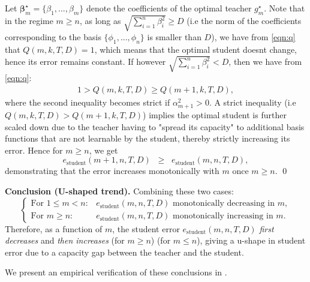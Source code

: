 Let $\bm{\beta}^\star_m = \{\beta_1,...,\beta_m\}$ denote the coefficients of the optimal teacher $g^\star_m$. Note that in the regime $m\geq n$, as long as $\sqrt{\sum_{i=1}^n\beta_i^2}\geq D$ (i.e the norm of the coefficients corresponding to the basis $\{\phi_1,...,\phi_n\}$ is smaller than $D$), we have from \cref{eqn:q} that $Q(m,k,T,D) = 1$, which means that the optimal student doesnt change, hence its error remains constant. If however $\sqrt{\sum_{i=1}^n\beta_i^2}<D$, then we have from \cref{eqn:q}:
\begin{align}
	1 > Q(m,k,T,D) \geq Q(m+1,k,T,D),
\end{align}
where the second inequality becomes strict if $\alpha_{m+1}^2>0$. A strict inequality (i.e $Q(m,k,T,D) > Q(m+1,k,T,D)$) implies the optimal student is further scaled down due to the teacher having to "spread its capacity" to additional basis functions that are not learnable by the student, thereby strictly increasing its error.
Hence for $m\geq n$, we get
\[
	e_{\text{student}}(m+1,n,T,D)
	\;\;\ge\;\;
	e_{\text{student}}(m,n,T,D),
\]
demonstrating that the error increases monotonically with $m$ once $m\geq n$.
\qed

\medskip

\noindent
\textbf{Conclusion (U-shaped trend).} Combining these two cases:
\[
	\begin{cases}
		\text{For }1 \le m < n: &
		e_{\text{student}}(m,n,T,D)\text{ monotonically decreasing in }m, \\[4pt]
		\text{For }m\geq n:     &
		e_{\text{student}}(m,n,T,D)\text{ monotonically increasing in }m.
	\end{cases}
\]
Therefore, as a function of $m$, the student error $e_{\text{student}}(m,n,T,D)$
\emph{first decreases} and \emph{then increases} (for $m\geq n$) (for $m\le n$), giving a u-shape in student error due to a capacity gap between the teacher and the student.
\hfill\qedsymbol

We present an empirical verification of these conclusions in .

